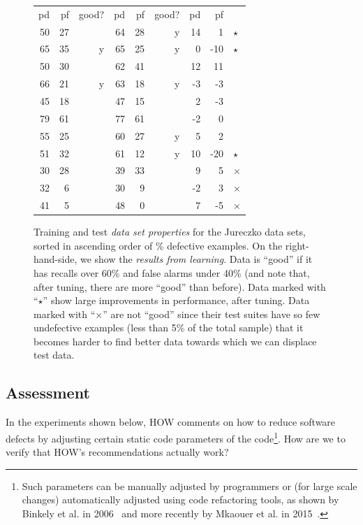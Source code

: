 \documentclass[conference]{IEEEtran}
\begin{document}
\begin{figure}[!t]
\begin{center}
\begin{minipage}{.4\linewidth}
\begin{tabular}{|rrr|rrr|rr|l}
  pd & pf & good? & pd & pf & good? & pd & pf\\\cline{1-8}
  50 & 27 &   & 64 & 28 & y & 14 & 1&$\star$\\
  65 & 35 & y & 65 & 25 & y & 0 & -10&$\star$\\
  50 & 30 &   & 62 & 41 &   & 12 & 11\\
  66 & 21 & y & 63 & 18 & y & -3 & -3\\
  45 & 18 &   & 47 & 15 &   & 2 & -3\\
  79 & 61 &   & 77 & 61 &   & -2 & 0\\
  55 & 25 &   & 60 & 27 & y & 5 & 2\\
  51 & 32 &   & 61 & 12 & y & 10 & -20&$\star$\\
 30 & 28 &   & 39 & 33 &   & 9 & 5&$\times$\\
  32 & 6 &   & 30 & 9 &   & -2 & 3&$\times$\\
  41 & 5 &   & 48 & 0 &   & 7 & -5&$\times$\\
\hline 
\end{tabular}

\end{minipage}
\end{center}    
  
    \caption{Training and test {\em data set properties} for the Jureczko data sets,
    sorted in ascending order of \% defective examples.
    On the right-hand-side, we show the {\em results from learning}.
    Data is ``good'' if it has   recalls over 60\% and false alarms under 40\%
(and note that, after tuning, there are more ``good'' than before).
Data   marked with ``$\star$'' show large improvements in performance, after tuning.
Data   marked with ``$\times$'' are not ``good'' since their test suites  have so few undefective examples (less than 5\% of the total sample) that it becomes harder to find better data towards which we can displace test data.
}\label{fig:j}
\end{figure}




\subsection{Assessment}\label{sect:assess}
In the experiments shown below,  HOW comments  on how to reduce
software defects by adjusting certain static code parameters of the code\footnote{Such parameters can be manually adjusted by programmers or (for large scale changes) automatically adjusted using code refactoring
tools, as shown by Binkely et al. in 2006~\cite{Binkley2006} and more recently by Mkaouer et al. in 2015~\cite{Mkaouer15}.}. How are we to verify that HOW's recommendations actually work? 
\end{document}
